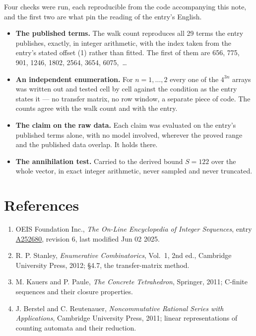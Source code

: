 \documentclass[11pt]{article}
\theoremstyle{definition}
\begin{document}
Four checks were run, each reproducible from the code accompanying this note, and the first two are what pin the reading of the entry's English.

\begin{itemize}

\item {\bfseries The published terms.} The walk count reproduces all 29 terms the entry publishes, exactly, in integer arithmetic, with the index taken from the entry's stated offset (1) rather than fitted. The first of them are 656, 775, 901, 1246, 1802, 2564, 3654, 6075,~\dots

\item {\bfseries An independent enumeration.} For $n = 1,\dots,2$ every one of the $4^{3n}$ arrays was written out and tested cell by cell against the condition as the entry states it --- no transfer matrix, no row window, a separate piece of code. The counts agree with the walk count and with the entry.

\item {\bfseries The claim on the raw data.} Each claim was evaluated on the entry's published terms alone, with no model involved, wherever the proved range and the published data overlap. It holds there.

\item {\bfseries The annihilation test.} Carried to the derived bound $S = 122$ over the whole vector, in exact integer arithmetic, never sampled and never truncated.

\end{itemize}

\section{References}

\begin{enumerate}

\item OEIS Foundation Inc., \emph{The On-Line Encyclopedia of Integer Sequences}, entry \href{https://oeis.org/A252680}{A252680}, revision 6, last modified Jun 02 2025.

\item R. P. Stanley, \emph{Enumerative Combinatorics}, Vol.~1, 2nd ed., Cambridge University Press, 2012; \S4.7, the transfer-matrix method.

\item M. Kauers and P. Paule, \emph{The Concrete Tetrahedron}, Springer, 2011; C-finite sequences and their closure properties.

\item J. Berstel and C. Reutenauer, \emph{Noncommutative Rational Series with Applications}, Cambridge University Press, 2011; linear representations of counting automata and their reduction.

\end{enumerate}
\end{document}
